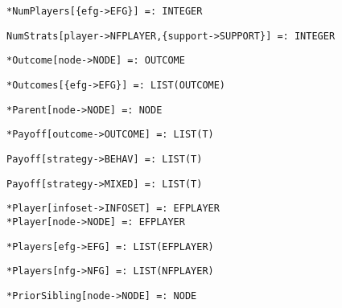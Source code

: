 \protect \large \begin{verbatim}
*NumPlayers[{efg->EFG}] =: INTEGER
\end{verbatim} \normalsize

\protect \large \begin{verbatim}
NumStrats[player->NFPLAYER,{support->SUPPORT}] =: INTEGER
\end{verbatim}\normalsize

\protect \large \begin{verbatim}
*Outcome[node->NODE] =: OUTCOME
\end{verbatim}\normalsize

\protect \large \begin{verbatim}
*Outcomes[{efg->EFG}] =: LIST(OUTCOME)
\end{verbatim}\normalsize

\protect \large \begin{verbatim}
*Parent[node->NODE] =: NODE
\end{verbatim}\normalsize

\protect \large \begin{verbatim}
*Payoff[outcome->OUTCOME] =: LIST(T)
\end{verbatim}\normalsize

\protect \large \begin{verbatim}
Payoff[strategy->BEHAV] =: LIST(T)
\end{verbatim}\normalsize

\protect \large \begin{verbatim}
Payoff[strategy->MIXED] =: LIST(T)
\end{verbatim}\normalsize

\protect \large \begin{verbatim}
*Player[infoset->INFOSET] =: EFPLAYER
*Player[node->NODE] =: EFPLAYER
\end{verbatim}\normalsize

\protect \large \begin{verbatim}
*Players[efg->EFG] =: LIST(EFPLAYER)
\end{verbatim} \normalsize

\protect \large \begin{verbatim}
*Players[nfg->NFG] =: LIST(NFPLAYER)
\end{verbatim} \normalsize

\protect \large \begin{verbatim}
*PriorSibling[node->NODE] =: NODE
\end{verbatim}\normalsize

